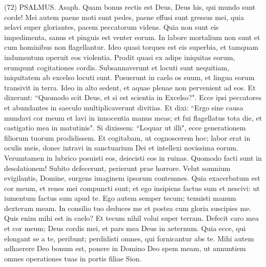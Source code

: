 \begin{biblechapter}  (72) 
\verse  PSALMUS. Asaph. Quam bonus rectis est Deus, Deus his, qui mundo sunt corde! 
\verse Mei autem paene moti sunt pedes, paene effusi sunt gressus mei, 
\verse quia zelavi super gloriantes, pacem peccatorum videns. 
\verse Quia non sunt eis impedimenta, sanus et pinguis est venter eorum. 
\verse In labore mortalium non sunt et cum hominibus non flagellantur. 
\verse Ideo quasi torques est eis superbia, et tamquam indumentum operuit eos violentia. 
\verse Prodit quasi ex adipe iniquitas eorum, erumpunt cogitationes cordis. 
\verse Subsannaverunt et locuti sunt nequitiam, iniquitatem ab excelso locuti sunt. 
\verse Posuerunt in caelo os suum, et lingua eorum transivit in terra. 
\verse Ideo in alto sedent, et aquae plenae non pervenient ad eos. 
\verse Et dixerunt: “Quomodo scit Deus, et si est scientia in Excelso?". 
\verse Ecce ipsi peccatores et abundantes in saeculo multiplicaverunt divitias. 
\verse Et dixi: “Ergo sine causa mundavi cor meum et lavi in innocentia manus meas; 
\verse et fui flagellatus tota die, et castigatio mea in matutinis". 
\verse Si dixissem: “Loquar ut illi", ecce generationem filiorum tuorum prodidissem. 
\verse Et cogitabam, ut cognoscerem hoc; labor erat in oculis meis, 
\verse donec intravi in sanctuarium Dei et intellexi novissima eorum. 
\verse Verumtamen in lubrico posuisti eos, deiecisti eos in ruinas. 
\verse Quomodo facti sunt in desolationem! Subito defecerunt, perierunt prae horrore. 
\verse Velut somnium evigilantis, Domine, surgens imaginem ipsorum contemnes. 
\verse Quia exacerbatum est cor meum, et renes mei compuncti sunt; 
\verse et ego insipiens factus sum et nescivi: ut iumentum factus sum apud te. 
\verse Ego autem semper tecum; tenuisti manum dexteram meam. 
\verse In consilio tuo deduces me et postea cum gloria suscipies me. 
\verse Quis enim mihi est in caelo? Et tecum nihil volui super terram. 
\verse Defecit caro mea et cor meum; Deus cordis mei, et pars mea Deus in aeternum. 
\verse Quia ecce, qui elongant se a te, peribunt; perdidisti omnes, qui fornicantur abs te. 
\verse Mihi autem adhaerere Deo bonum est, ponere in Domino Deo spem meam, ut annuntiem omnes operationes tuas in portis filiae Sion. 
\end{biblechapter}

